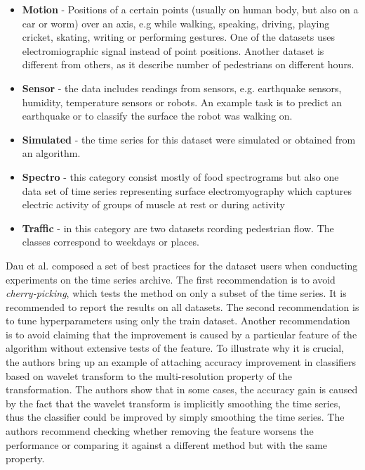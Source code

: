 \documentclass[a4paper,11pt,twoside]{report}
\theoremstyle{definition}
\begin{document}
\begin{itemize}
\item \textbf{Motion} - Positions of a certain points (usually on human body, but also on a car or worm) over an axis, e.g while walking, speaking, driving, playing cricket, skating, writing or performing gestures. One of the datasets uses electromiographic signal instead of point positions. Another dataset is different from others, as it describe number of pedestrians on different hours.


\item \textbf{Sensor} - the data includes readings from sensors, e.g. earthquake sensors, humidity, temperature sensors or robots. An example task is to predict an earthquake or to classify the surface the robot was walking on.

\item \textbf{Simulated} - the time series for this dataset were simulated or obtained from an algorithm.

\item \textbf{Spectro} - this category consist mostly of food spectrograms but also one data set of time series representing  surface electromyography which captures electric activity of groups of muscle at rest or during activity

\item \textbf{Traffic} - in this category are two datasets rcording pedestrian flow. The classes correspond to weekdays or places.


\end{itemize}

Dau et al. \cite{UCR_article} composed a set of best practices for the dataset users when conducting experiments on the time series archive. The first recommendation is to avoid \textit{cherry-picking}, which tests the method on only a subset of the time series. It is recommended to report the results on all datasets. The second recommendation is to tune hyperparameters using only the train dataset. Another recommendation is to avoid claiming that the improvement is caused by a particular feature of the algorithm without extensive tests of the feature. To illustrate why it is crucial, the authors bring up an example of attaching accuracy improvement in classifiers based on wavelet transform to the multi-resolution property of the transformation. The authors show that in some cases, the accuracy gain is caused by the fact that the wavelet transform is implicitly smoothing the time series, thus the classifier could be improved by simply smoothing the time series. The authors recommend checking whether removing the feature worsens the performance or comparing it against a different method but with the same property.
\end{document}

